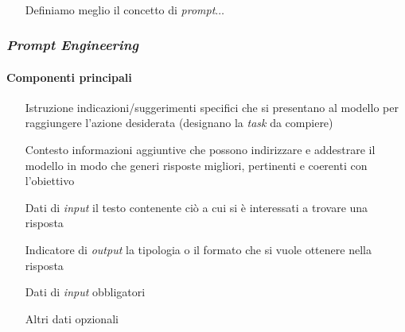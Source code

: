 \begin{frame}[t]
{\begin{minipage}[t]{\textwidth}
\begin{figure}
        \end{figure}
    \end{minipage}
    \\\vspace*{.3cm}
    \begin{minipage}[t]{\textwidth}
        \begin{itemize}[leftmargin=10pt,align=right]
            \item[\alert{\faArrowCircleRight}] Definiamo meglio il concetto di \emph{prompt}$\ldots$
        \end{itemize}
    \end{minipage}
}
\end{frame}
%
\begin{frame}[t] \frametitle{\emph{Prompt Engineering}}
\framesubtitle{Componenti principali}
{\small
{}
    \begin{minipage}[t]{\textwidth}
        \begin{itemize}[leftmargin=70pt,align=right]
            \item[\alert{Istruzione}] indicazioni/suggerimenti specifici che si presentano al modello per raggiungere l'azione desiderata (designano la \emph{task} da compiere)
            \item[\alert{Contesto}] informazioni aggiuntive che possono indirizzare e addestrare il modello in modo che generi risposte migliori, pertinenti e coerenti con l’obiettivo
            \item[\alert{Dati di \emph{input}}] il testo contenente ciò a cui si è interessati a trovare una risposta
            \item[\alert{Indicatore di \emph{output}}] la tipologia o il formato che si vuole ottenere nella risposta
        \end{itemize}
        \vspace*{.5cm}
        \begin{itemize}[leftmargin=10pt,align=right]
            \item[\alert{\faArrowCircleRight}] Dati di \emph{input} obbligatori
            \item[\alert{\faArrowCircleRight}] Altri dati opzionali
        \end{itemize}
    \end{minipage}
}
\end{frame}
%
